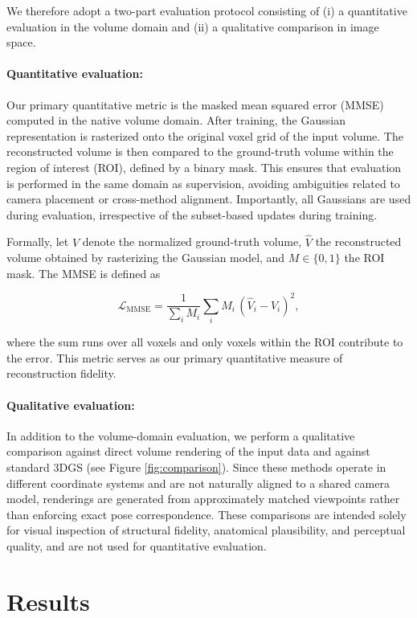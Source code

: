\documentclass[runningheads]{llncs}
\begin{document}
We therefore adopt a two-part evaluation protocol consisting of (i) a quantitative evaluation in the volume domain and (ii) a qualitative comparison in image space.

\paragraph{Quantitative evaluation:}
Our primary quantitative metric is the masked mean squared error (MMSE) computed in the native volume domain. After training, the Gaussian representation is rasterized onto the original voxel grid of the input volume. The reconstructed volume is then compared to the ground-truth volume within the region of interest (ROI), defined by a binary mask. This ensures that evaluation is performed in the same domain as supervision, avoiding ambiguities related to camera placement or cross-method alignment. Importantly, all Gaussians are used during evaluation, irrespective of the subset-based updates during training.

Formally, let $V$ denote the normalized ground-truth volume, $\hat{V}$ the reconstructed volume obtained by rasterizing the Gaussian model, and $M \in \{0,1\}$ the ROI mask. The MMSE is defined as

\begin{equation}
\mathcal{L}_{\mathrm{MMSE}} =
\frac{1}{\sum_i M_i}
\sum_i M_i \, (\hat{V}_i - V_i)^2,
\end{equation}

where the sum runs over all voxels and only voxels within the ROI contribute to the error. This metric serves as our primary quantitative measure of reconstruction fidelity.

\paragraph{Qualitative evaluation:}
In addition to the volume-domain evaluation, we perform a qualitative comparison against direct volume rendering of the input data and against standard 3DGS (see Figure \ref{fig:comparison}). Since these methods operate in different coordinate systems and are not naturally aligned to a shared camera model, renderings are generated from approximately matched viewpoints rather than enforcing exact pose correspondence. These comparisons are intended solely for visual inspection of structural fidelity, anatomical plausibility, and perceptual quality, and are not used for quantitative evaluation.


\section{Results}
\end{document}
